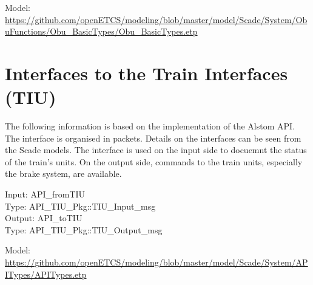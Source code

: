 \documentclass{template/openetcs_report}
\begin{document}
Model: \url{https://github.com/openETCS/modeling/blob/master/model/Scade/System/ObuFunctions/Obu_BasicTypes/Obu_BasicTypes.etp}

\section{Interfaces to the Train Interfaces (TIU)}
The following information is based on the implementation of the Alstom API. The interface is organised in packets. Details on the interfaces can be seen from the Scade models. The interface is used on the input side to docuemnt the status of the train's units. On the output side, commands to the train units, especially the brake system, are available.

Input: API\_fromTIU\\
Type: API\_TIU\_Pkg::TIU\_Input\_msg\\

Output: API\_toTIU\\
Type: API\_TIU\_Pkg::TIU\_Output\_msg

Model: \url{https://github.com/openETCS/modeling/blob/master/model/Scade/System/APITypes/APITypes.etp}





\newpage
{}
\printindex
\end{document}
